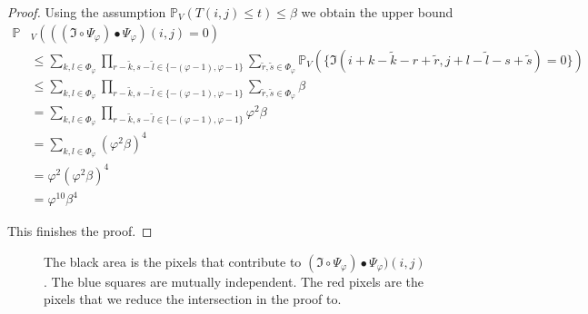 \documentclass[a4paper,12pt]{article}
\theoremstyle{plain}
\theoremstyle{definition}
\begin{document}
\begin{proof}
	Using the assumption $\mathbb{P}_V\left( T(i, j) \leq t \right) \leq \beta$ we obtain the upper bound
	\begin{align*}
		\mathbb{P}&_V( ((\mathfrak{I} \circ \Psi_\varphi) \bullet \Psi_\varphi)(i, j) = 0 ) \\
		&\leq \sum_{k, l \in \Phi_\varphi} \prod_{r - \tilde{k}, s - \tilde{l} \in \{ - ( \varphi - 1 ), \varphi - 1 \}} \sum_{\tilde{r}, \tilde{s} \in \Phi_\varphi} \mathbb{P}_V\left( \{ \mathfrak{I}(i + k - \tilde{k} - r + \tilde{r}, j + l - \tilde{l} - s + \tilde{s}) = 0 \} \right) \\
		&\leq \sum_{k, l \in \Phi_\varphi} \prod_{r - \tilde{k}, s - \tilde{l} \in \{ - ( \varphi - 1 ), \varphi - 1 \}} \sum_{\tilde{r}, \tilde{s} \in \Phi_\varphi} \beta \\
		&= \sum_{k, l \in \Phi_\varphi} \prod_{r - \tilde{k}, s - \tilde{l} \in \{ - ( \varphi - 1 ), \varphi - 1 \}} \varphi^2 \beta \\
		&= \sum_{k, l \in \Phi_\varphi} ( \varphi^2 \beta )^4 \\
		&= \varphi^2 ( \varphi^2 \beta )^4 \\
		&= \varphi^{10} \beta^4
	\end{align*}
	
	This finishes the proof.
\end{proof}

\newpage

\begin{figure}[h]
	\centering
	\caption{The black area is the pixels that contribute to $(\mathfrak{I} \circ \Psi_\varphi) \bullet \Psi_\varphi)(i, j)$. The blue squares are mutually independent. The red pixels are the pixels that we reduce the intersection in the proof to.}
	\label{powerindependentpoints}
\end{figure}
\end{document}
